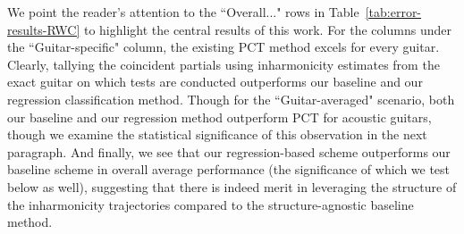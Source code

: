 \documentclass[12pt]{cmuthesis}
\begin{document}

We point the reader's attention to the ``Overall..." rows in Table~\ref{tab:error-results-RWC} to highlight the central results of this work. For the columns under the ``Guitar-specific" column, the existing PCT method excels for every guitar. Clearly, tallying the coincident partials using inharmonicity estimates from the exact guitar on which tests are conducted outperforms our baseline and our regression classification method. Though for the ``Guitar-averaged" scenario, both our baseline and our regression method outperform PCT for acoustic guitars, though we examine the statistical significance of this observation in the next paragraph. And finally, we see that our regression-based scheme outperforms our baseline scheme in overall average performance (the significance of which we test below as well), suggesting that there is indeed merit in leveraging the structure of the inharmonicity trajectories compared to the structure-agnostic baseline method.
\end{document}
